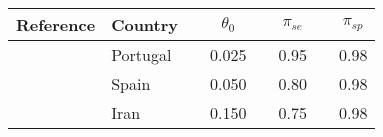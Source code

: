 \begin{tabular}{llcccccc} 
\toprule
Reference & Country &  & $\theta_0$ &  & $\pi_{se}$ &  & $\pi_{sp}$ \\ 
\midrule
\citet{kislayaSeroprevalenceSARSCoV2Infection2021} & Portugal & & 0.025 & & 0.95 & & 0.98 \\
\citet{pollanPrevalenceSARSCoV2Spain2020}  & Spain    & & 0.050 & & 0.80 & & 0.98 \\
\citet{khalagiPrevalenceCOVID19Iran2021} & Iran     & & 0.150 & & 0.75 & & 0.98 \\
\bottomrule
\end{tabular}